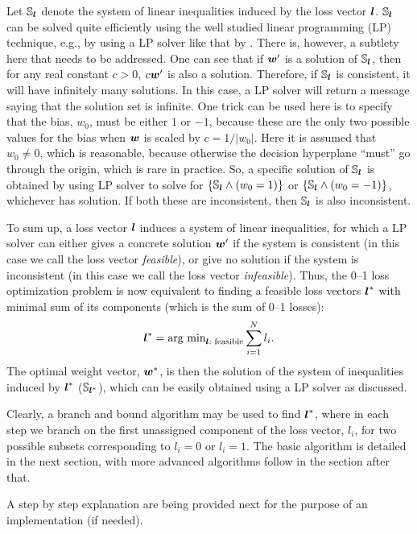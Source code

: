 Let $\mathbb{S}_{\boldsymbol{l}}$ denote the system of linear inequalities induced by the
loss vector $\boldsymbol{l}$.  $\mathbb{S}_{\boldsymbol{l}}$ can be solved quite efficiently using the
well studied linear programming (LP) technique, e.g., by using a LP
solver like that by \cite{lpsolve}. There is, however, a subtlety here
that needs to be addressed. One can see that if $\boldsymbol{w}'$ is a solution of
$\mathbb{S}_{\boldsymbol{l}}$, then for any real constant $c > 0$, $c \boldsymbol{w}'$ is also a
solution. Therefore, if $\mathbb{S}_{\boldsymbol{l}}$ is consistent, it will have
infinitely many solutions. In this case, a LP solver will return a
message saying that the solution set is infinite. One trick can be
used here is to specify that the bias, $w_0$, must be either $1$ or
$-1$, because these are the only two possible values for the bias when
$\boldsymbol{w}$ is scaled by $c=1 / |w_0|$. Here it is assumed that $w_0 \not=
0$, which is reasonable, because otherwise the decision hyperplane
``must'' go through the origin, which is rare in practice. So, a
specific solution of $\mathbb{S}_{\boldsymbol{l}}$ is obtained by using LP solver to solve
for $\{ \mathbb{S}_{\boldsymbol{l}} \land (w_0=1) \}$ or $\{ \mathbb{S}_{\boldsymbol{l}} \land (w_0=-1) \}$,
whichever has solution. If both these are inconsistent, then $\mathbb{S}_{\boldsymbol{l}}$
is also inconsistent.

To sum up, a loss vector $\boldsymbol{l}$ induces a system of linear inequalities,
for which a LP solver can either gives a concrete solution $\boldsymbol{w}'$ if
the system is consistent (in this case we call the loss vector
\emph{feasible}), or give no solution if the system is inconsistent
(in this case we call the loss vector \emph{infeasible}). Thus, the
0--1 loss optimization problem is now equivalent to finding a feasible
loss vectors $\boldsymbol{l}^*$ with minimal sum of its components (which is the
sum of 0--1 losses):
$$\boldsymbol{l}^* = \text{arg min}_{\boldsymbol{l} : \text{ feasible}} \sum_{i=1}^N l_i.$$
The optimal weight vector, $\boldsymbol{w}^*$, is then the solution of the system
of inequalities induced by $\boldsymbol{l}^*$ ($\mathbb{S}_{\boldsymbol{l}^*}$), which can be easily
obtained using a LP solver as discussed.

Clearly, a branch and bound algorithm may be used to find $\boldsymbol{l}^*$,
where in each step we branch on the first unassigned component of the
loss vector, $l_i$, for two possible subsets corresponding to $l_i =
0$ or $l_i = 1$. The basic algorithm is detailed in the next section,
with more advanced algorithms follow in the section after that.


A step by step explanation are being provided next for the purpose of an implementation (if needed).

